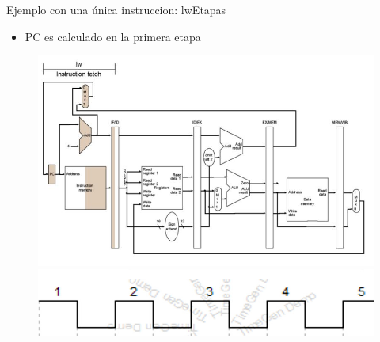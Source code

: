 \documentclass[aspectratio=169,compress]{beamer}
\begin{document}
\begin{footnotesize}
\begin{frame}{Ejemplo con una única instruccion: lw}{Etapas}
\begin{itemize}
\item PC es calculado en la primera etapa
\end{itemize}
\begin{figure}
\includegraphics[scale=0.27]{images/lw1.jpg} \\
\includegraphics[scale=0.27]{images/clock2.jpg} 
\end{figure}

\end{frame}




\end{footnotesize}
\end{document}
